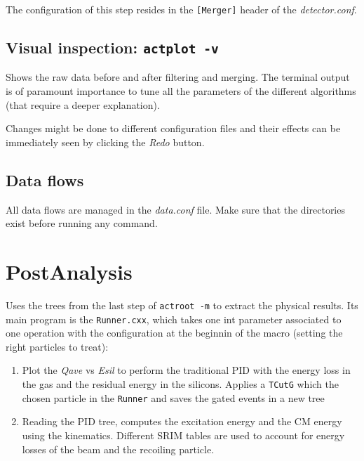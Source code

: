 \documentclass[11pt, a4paper, galician]{article}
\begin{document}
The configuration of this step resides in the \lstinline|[Merger]| header of the \textit{detector.conf}.

\subsection*{Visual inspection: \lstinline|actplot -v|}
Shows the raw data before and after filtering and merging. The terminal output is of paramount importance to tune all the parameters of the different algorithms (that require a deeper explanation).

Changes might be done to different configuration files and their effects can be immediately seen by clicking the \textit{Redo} button.

\subsection*{Data flows}
All data flows are managed in the \textit{data.conf} file. Make sure that the directories exist before running any command. 

\section{PostAnalysis}
Uses the trees from the last step of \lstinline|actroot -m| to extract the physical results. Its main program is the \lstinline|Runner.cxx|, which takes one int parameter associated to one operation with the configuration at the beginnin of the macro (setting the right particles to treat):
\begin{enumerate}
    \item Plot the \textit{Qave} vs \textit{Esil} to perform the traditional PID with the energy loss in the gas and the residual energy in the silicons. Applies a \lstinline|TCutG| which the chosen particle in the \lstinline|Runner| and saves the gated events in a new tree
    \item Reading the PID tree, computes the excitation energy and the CM energy using the kinematics. Different SRIM tables are used to account for energy losses of the beam and the recoiling particle.
\end{enumerate}
\end{document}
